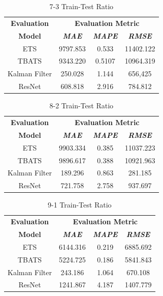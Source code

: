 \documentclass[conference]{IEEEtran}
\begin{document}
\begin{table}[htbp]
\caption{7-3 Train-Test Ratio}
\begin{center}
\begin{tabular}{|c|c|c|c|}
\hline
\textbf{Evaluation}&\multicolumn{3}{|c|}{\textbf{Evaluation Metric}} \\
\cline{2-4}
\textbf{Model} & \textbf{\textit{MAE}}& \textbf{\textit{MAPE}}& \textbf{\textit{RMSE}} \\
\hline
ETS & 9797.853 & 0.533 & 11402.122\\
\hline
TBATS & 9343.220 & 0.5107 & 10964.319\\
\hline
Kalman Filter & 250.028 & 1.144 & 656,425\\
\hline
ResNet & 608.818 & 2.916 & 784.812\\
\hline
\end{tabular}
\label{tab1}
\end{center}
\end{table}

\begin{table}[htbp]
\caption{8-2 Train-Test Ratio}
\begin{center}
\begin{tabular}{|c|c|c|c|}
\hline
\textbf{Evaluation}&\multicolumn{3}{|c|}{\textbf{Evaluation Metric}} \\
\cline{2-4}
\textbf{Model} & \textbf{\textit{MAE}}& \textbf{\textit{MAPE}}& \textbf{\textit{RMSE}} \\
\hline
ETS & 9903.334 & 0.385 & 11037.223\\
\hline
TBATS & 9896.617 & 0.388 & 10921.963\\
\hline
Kalman Filter & 189.296 & 0.863 & 281.185\\
\hline
ResNet & 721.758 & 2.758 & 937.697\\
\hline
\end{tabular}
\label{tab1}
\end{center}
\end{table}

\begin{table}[htbp]
\caption{9-1 Train-Test Ratio}
\begin{center}
\begin{tabular}{|c|c|c|c|}
\hline
\textbf{Evaluation}&\multicolumn{3}{|c|}{\textbf{Evaluation Metric}} \\
\cline{2-4}
\textbf{Model} & \textbf{\textit{MAE}}& \textbf{\textit{MAPE}}& \textbf{\textit{RMSE}} \\
\hline
ETS & 6144.316 & 0.219 & 6885.692\\
\hline
TBATS & 5224.725 & 0.186 & 5841.843\\
\hline
Kalman Filter & 243.186 & 1.064 & 670.108\\
\hline
ResNet & 1241.867 & 4.187 & 1407.779\\
\hline
\end{tabular}
\label{tab1}
\end{center}
\end{table}
\end{document}
